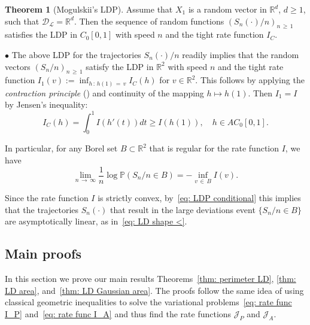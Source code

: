 \documentclass[10pt]{amsart}
\theoremstyle{definition}\newtheorem{defi}[theo]{Definition}\newtheorem{rema}[theo]{Remark}\newtheorem{exam}[theo]{Example}\newtheorem{exem}[theo]{Example}\newtheorem{nota}[theo]{Notation}
\newcommand{\Rbb}{\mathbb{R}}
\newcommand{\Pbb}{\mathbb{P}}
\newcommand{\Dcl}{\mathcal{D}}
\newcommand{\Lcl}{\mathcal{L}}
\newcommand{\Jcl}{\mathcal{J}}
\newtheorem*{theo*}{Theorem}\newenvironment{proofc}[1][\proofname]{\begin{proof}[#1]}{\end{proof}}
\begin{document}
\begin{theo*}[Mogulskii's LDP]
Assume that $X_1$ is a random vector in $\Rbb^d$, $d \ge 1$, such that $\Dcl_{\Lcl} = \Rbb^d$. Then the sequence of random functions $(S_n(\cdot)/n)_{n\,\ge\,1}$ satisfies the LDP in $C_0[0,1]$ with speed $n$ and the tight rate function $I_C$.
\end{theo*}
$\bullet$ The above LDP for the trajectories $S_n(\cdot)/n$ readily implies that the random vectors $(S_n/n)_{n\,\ge\,1}$ satisfy the LDP in $\Rbb^2$ with speed $n$ and the tight rate function $I_1(v) := \inf_{h\,:\,h(1)\,=\,v} I_C(h)$ for $v \in \Rbb^2$. This follows by applying the \emph{contraction principle} (\cite[Theorem~4.2.1]{DemboZeitouni}) and continuity of the mapping $h \mapsto h(1)$. Then $I_1=I$ by Jensen's inequality:
\begin{equation}\label{eqn: Jensen direct}
I_C(h)=\int_0^1 I(h'(t))dt \ge I(h(1)), \quad h \in AC_0[0,1].
\end{equation}

In particular, for any Borel set $B \subset \Rbb^2$ that is regular for the rate function $I$, we have
\[
\lim_{n\,\to\,\infty} \frac{1}{n} \log \Pbb(S_n/n \in B) =- \inf_{v\,\in\,B} I(v).
\]

Since the rate function $I$ is strictly convex, by~\eqref{eq: LDP conditional} this implies that the trajectories $S_n(\cdot)$ that result in the large deviations event $\{S_n/n \in B\}$ are asymptotically linear, as in~\eqref{eq: LD shape <}.



\subsection{Main proofs} \label{Sec: main proofs}
In this section we prove our main results Theorems~\ref{thm: perimeter LD}, \ref{thm: LD area}, and~\ref{thm: LD Gaussian area}. The proofs follow the same idea of using classical geometric inequalities to solve the variational problems~\eqref{eq: rate func I_P} and~\eqref{eq: rate func I_A} and thus find the rate functions $\Jcl_P$ and $\Jcl_A$.
\goodbreak
\end{document}
